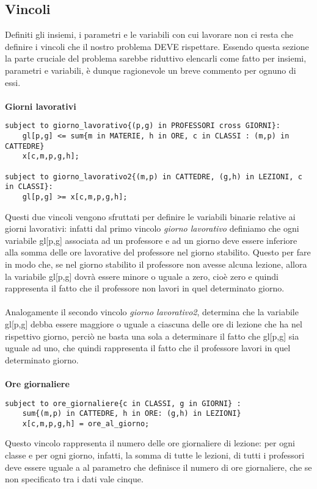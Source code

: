 \documentclass{article}
\begin{document}
\subsection{Vincoli}
Definiti gli insiemi, i parametri e le variabili con cui lavorare non ci resta che definire i vincoli che il nostro problema DEVE rispettare. Essendo questa sezione la parte cruciale del problema sarebbe riduttivo elencarli come fatto per insiemi, parametri e variabili, è dunque ragionevole un breve commento per ognuno di essi.
\\\\\textbf{Giorni lavorativi}
\begin{verbatim}
subject to giorno_lavorativo{(p,g) in PROFESSORI cross GIORNI}:
	gl[p,g] <= sum{m in MATERIE, h in ORE, c in CLASSI : (m,p) in CATTEDRE}
	x[c,m,p,g,h];

subject to giorno_lavorativo2{(m,p) in CATTEDRE, (g,h) in LEZIONI, c in CLASSI}:
	gl[p,g] >= x[c,m,p,g,h];
\end{verbatim}
Questi due vincoli vengono sfruttati per definire le variabili binarie relative ai giorni lavorativi: infatti dal primo vincolo \emph{giorno lavorativo} definiamo che ogni variabile gl[p,g] associata ad un professore e ad un giorno deve essere inferiore alla somma delle ore lavorative del professore nel giorno stabilito. Questo per fare in modo che, se nel giorno stabilito il professore non avesse alcuna lezione, allora la variabile gl[p,g] dovrà essere minore o uguale a zero, cioè zero e quindi rappresenta il fatto che il professore non lavori in quel determinato giorno.
\\\\Analogamente il secondo vincolo \emph{giorno lavorativo2}, determina che la variabile gl[p,g] debba essere maggiore o uguale a ciascuna delle ore di lezione che ha nel rispettivo giorno, perciò ne basta una sola a determinare il fatto che gl[p,g] sia uguale ad uno, che quindi rappresenta il fatto che il professore lavori in quel determinato giorno.
\\\\\textbf{Ore giornaliere}
\begin{verbatim}
subject to ore_giornaliere{c in CLASSI, g in GIORNI} : 
	sum{(m,p) in CATTEDRE, h in ORE: (g,h) in LEZIONI}
	x[c,m,p,g,h] = ore_al_giorno;
\end{verbatim}
Questo vincolo rappresenta il numero delle ore giornaliere di lezione: per ogni classe e per ogni giorno, infatti, la somma di tutte le lezioni, di tutti i professori deve essere uguale a al parametro che definisce il numero di ore giornaliere, che se non specificato tra i dati vale cinque.
\end{document}
